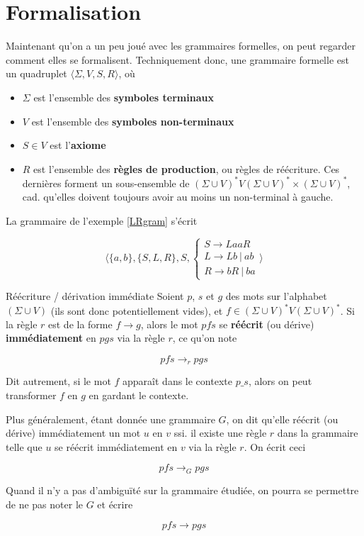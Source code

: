  \section{Formalisation}
 
 Maintenant qu'on a un peu joué avec les grammaires formelles, on peut regarder comment elles se formalisent. Techniquement donc, une grammaire formelle est un quadruplet $\big \langle\Sigma, V, S, R \big \rangle$, où
 
 \begin{itemize}
 \item $\Sigma$ est l'ensemble des \textbf{symboles terminaux}
 \item $V$ est l'ensemble des \textbf{symboles non-terminaux}
 \item $S \in V$ est l'\textbf{axiome}
 \item $R$ est l'ensemble des \textbf{règles de production}, ou règles de réécriture. Ces dernières forment un sous-ensemble de $(\Sigma \cup V)^*V(\Sigma \cup V)^* \times (\Sigma \cup V)^*$, cad. qu'elles doivent toujours avoir au moins un non-terminal à gauche. 
 \end{itemize}
 
 
 
\begin{example}
La grammaire de l'exemple \ref{LRgram} s'écrit 

\[
\big \langle \{a,b\},\{S,L,R\},S, \begin{cases}
S \rightarrow LaaR \\
L \rightarrow Lb~|~ab \\
R \rightarrow bR~|~ba
\end{cases}
 \big \rangle
\]


\begin{definition}{Réécriture / dérivation immédiate}{}
Soient $p$, $s$ et $g$ des mots sur l'alphabet $(\Sigma \cup V)$ (ils sont donc potentiellement vides), et $f \in (\Sigma \cup V)^*V(\Sigma \cup V)^*$. Si la règle $r$ est de la forme $f \rightarrow g$, alors le mot $pfs$ se \textbf{réécrit} (ou dérive) \textbf{immédiatement} en $pgs$ via la règle $r$, ce qu'on note 

\[
pfs \rightarrow_r pgs
\]

Dit autrement, si le mot $f$ apparaît dans le contexte $p \_ s$, alors on peut transformer $f$ en $g$ en gardant le contexte.

Plus généralement, étant donnée une grammaire $G$, on dit qu'elle réécrit (ou dérive) immédiatement un mot $u$ en $v$ ssi. il existe une règle $r$ dans la grammaire telle que $u$ se réécrit immédiatement en $v$ via la règle $r$. On écrit ceci 

\[
pfs \rightarrow_G pgs
\]

Quand il n'y a pas d'ambiguïté sur la grammaire étudiée, on pourra se permettre de ne pas noter le $G$ et écrire 

\[
pfs \rightarrow pgs
\]

\end{definition}

\end{example}


